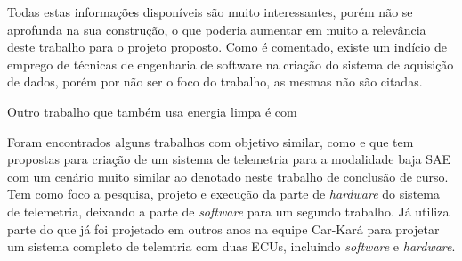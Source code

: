 Todas estas informações disponíveis são muito interessantes, porém \cite{gprsTelemetrySystem2013} não se aprofunda na sua construção, o que poderia aumentar em muito a relevância deste trabalho para o projeto proposto. Como é comentado, existe um indício de emprego de técnicas de engenharia de software na criação do sistema de aquisição de dados, porém por não ser o foco do trabalho, as mesmas não são citadas. 

Outro trabalho que também usa energia limpa é \cite{applicationOfData2010} com 


Foram encontrados alguns trabalhos com objetivo similar, como \cite{Dias2010} e \cite{Nunes2016} que tem propostas para criação de um sistema de telemetria para a modalidade baja SAE com um cenário muito similar ao denotado neste trabalho de conclusão de curso. \cite{Dias2010} Tem como foco a pesquisa, projeto e execução da parte de \textit{hardware} do sistema de telemetria, deixando a parte de \textit{software} para um segundo trabalho. Já \cite{Nunes2016} utiliza parte do que já foi projetado em outros anos na equipe Car-Kará para projetar um sistema completo de telemtria com duas ECUs, incluindo \textit{software} e \textit{hardware}.  

